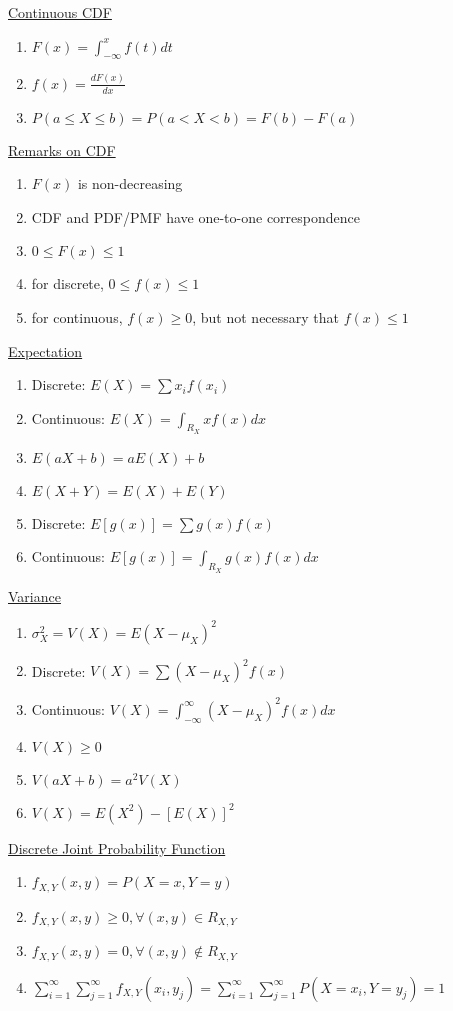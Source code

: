 \documentclass[a4paper,1pt,landscape]{article}
\begin{document}
\begin{multicols}{3}
\underline{Continuous CDF}
\begin{enumerate}
    \item $F(x) = \int_{-\infty}^x f(t) dt$
    \item $f(x) = \frac{dF(x)}{dx}$
    \item $P(a \leq X \leq b) = P(a < X < b) = F(b) - F(a)$
\end{enumerate}

\underline{Remarks on CDF}
\begin{enumerate}
    \item $F(x)$ is non-decreasing
    \item CDF and PDF/PMF have one-to-one correspondence
    \item $0 \leq F(x) \leq 1$
    \item for discrete, $0 \leq f(x) \leq 1$
    \item for continuous, $f(x) \geq 0$, but not necessary that $f(x) \leq 1$
\end{enumerate}

\underline{Expectation}
\begin{enumerate}
    \item Discrete: $E(X) = \sum x_i f(x_i)$
    \item Continuous: $E(X) = \int_{R_X} xf(x) dx$
    \item $E(aX+b) = aE(X) + b$
    \item $E(X+Y) = E(X) + E(Y)$
    \item Discrete: $E[g(x)] = \sum g(x)f(x)$
    \item Continuous: $E[g(x)] = \int_{R_X} g(x)f(x) dx$
\end{enumerate}

\underline{Variance}
\begin{enumerate}
    \item $\sigma_X^2 = V(X) = E(X-\mu_X)^2$
    \item Discrete: $V(X) = \sum (X-\mu_X)^2f(x)$
    \item Continuous: $V(X) = \int_{-\infty}^\infty(X-\mu_X)^2f(x)dx$
    \item $V(X) \geq 0$
    \item $V(aX+b) = a^2 V(X)$
    \item $V(X) = E(X^2) - [E(X)]^2$
\end{enumerate}

\underline{Discrete Joint Probability Function}
\begin{enumerate}
    \item $f_{X,Y}(x,y) = P(X=x, Y=y)$
    \item $f_{X,Y}(x,y) \geq 0, \forall (x,y) \in R_{X,Y}$
    \item $f_{X,Y}(x,y) = 0, \forall (x,y) \notin R_{X,Y}$
    \item $\sum_{i=1}^\infty \sum_{j=1}^\infty f_{X,Y}(x_i, y_j) = \sum_{i=1}^\infty \sum_{j=1}^\infty P(X=x_i, Y=y_j) = 1$
\end{enumerate}


\end{multicols}
\end{document}
